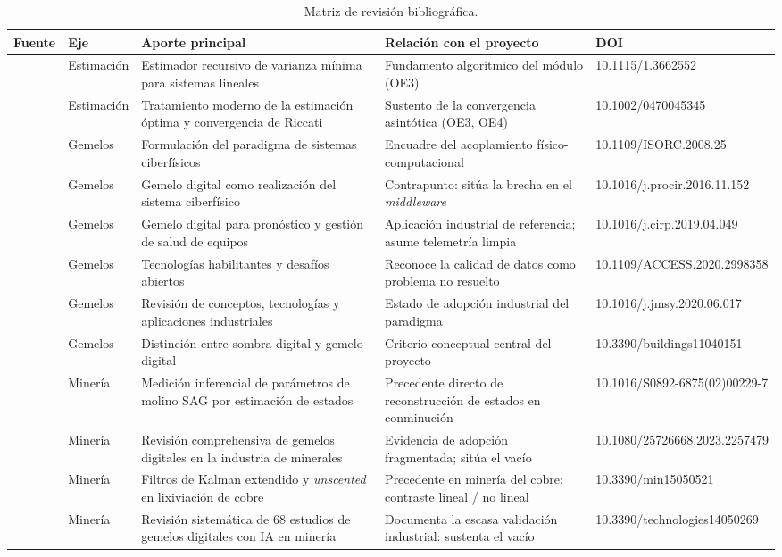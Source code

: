 \begin{table}[H]
\centering
\caption{Matriz de revisión bibliográfica.}
\label{tab:matriz-biblio}
\scriptsize
\begin{tabular}{@{}p{2.4cm}p{1.5cm}p{3.1cm}p{3.4cm}p{3.3cm}@{}}
\toprule
\textbf{Fuente} & \textbf{Eje} & \textbf{Aporte principal} &
\textbf{Relación con el proyecto} & \textbf{DOI}\\
\midrule
\textcite{kalman1960} & Estimación &
Estimador recursivo de varianza mínima para sistemas lineales &
Fundamento algorítmico del módulo (OE3) &
10.1115/1.3662552\\
\addlinespace
\textcite{simon2006} & Estimación &
Tratamiento moderno de la estimación óptima y convergencia de Riccati &
Sustento de la convergencia asintótica (OE3, OE4) &
10.1002/0470045345\\
\addlinespace
\textcite{lee2008} & Gemelos &
Formulación del paradigma de sistemas ciberfísicos &
Encuadre del acoplamiento físico-computacional &
10.1109/ISORC.2008.25\\
\addlinespace
\textcite{uhlemann2017} & Gemelos &
Gemelo digital como realización del sistema ciberfísico &
Contrapunto: sitúa la brecha en el \emph{middleware} &
10.1016/j.procir.2016.11.152\\
\addlinespace
\textcite{tao2019} & Gemelos &
Gemelo digital para pronóstico y gestión de salud de equipos &
Aplicación industrial de referencia; asume telemetría limpia &
10.1016/j.cirp.2019.04.049\\
\addlinespace
\textcite{fuller2020} & Gemelos &
Tecnologías habilitantes y desafíos abiertos &
Reconoce la calidad de datos como problema no resuelto &
10.1109/ACCESS.2020.2998358\\
\addlinespace
\textcite{liu2021} & Gemelos &
Revisión de conceptos, tecnologías y aplicaciones industriales &
Estado de adopción industrial del paradigma &
10.1016/j.jmsy.2020.06.017\\
\addlinespace
\textcite{sepasgozar2021} & Gemelos &
Distinción entre sombra digital y gemelo digital &
Criterio conceptual central del proyecto &
10.3390/buildings11040151\\
\addlinespace
\textcite{apelt2002} & Minería &
Medición inferencial de parámetros de molino SAG por estimación de estados &
Precedente directo de reconstrucción de estados en conminución &
10.1016/S0892-6875(02)00229-7\\
\addlinespace
\textcite{qu2023} & Minería &
Revisión comprehensiva de gemelos digitales en la industria de minerales &
Evidencia de adopción fragmentada; sitúa el vacío &
10.1080/25726668.2023.2257479\\
\addlinespace
\textcite{barzaga2025} & Minería &
Filtros de Kalman extendido y \emph{unscented} en lixiviación de cobre &
Precedente en minería del cobre; contraste lineal / no lineal &
10.3390/min15050521\\
\addlinespace
\textcite{ebad2026} & Minería &
Revisión sistemática de 68 estudios de gemelos digitales con IA en minería &
Documenta la escasa validación industrial: sustenta el vacío &
10.3390/technologies14050269\\
\bottomrule
\end{tabular}
\end{table}

